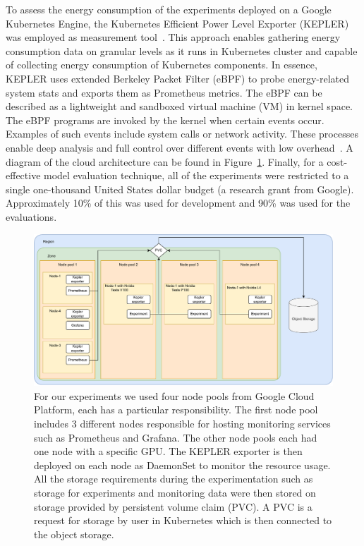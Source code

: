 \documentclass[conference]{IEEEtran}
\begin{document}
{To assess the energy consumption of the experiments deployed on a Google Kubernetes Engine, the Kubernetes Efficient Power Level Exporter (KEPLER) was employed as measurement tool~\cite{amaral2023kepler}. This approach enables gathering energy consumption data on granular levels as it runs in Kubernetes cluster and capable of collecting energy consumption of Kubernetes components. In essence, KEPLER uses extended Berkeley Packet Filter (eBPF) to probe energy-related system stats and exports them as Prometheus metrics. The eBPF can be described as a lightweight and sandboxed virtual machine (VM) in kernel space. The eBPF programs are invoked by the kernel when certain events occur. Examples of such events include system calls or network activity. These processes enable deep analysis and full control over different events with low overhead~\cite{sedghpour@ebpf}. A diagram of the cloud architecture can be found in Figure~\ref{fig:architecture}. Finally, for a cost-effective model evaluation technique, all of the experiments were restricted to a single one-thousand United States dollar budget (a research grant from Google). Approximately 10\% of this was used for development and 90\% was used for the evaluations.

\begin{figure}
    \centering
    \includegraphics[width=.8\textwidth]{plots/architecture.pdf}
    \caption{For our experiments we used four node pools from Google Cloud Platform, each has a particular responsibility. The first node pool includes 3 different nodes responsible for hosting monitoring services such as Prometheus and Grafana.  The other node pools each had one node with a specific GPU.  The KEPLER exporter is then deployed on each node as DaemonSet to monitor the resource usage.  All the storage requirements during the experimentation such as storage for experiments and monitoring data were then stored on storage provided by persistent volume claim (PVC). A PVC is a request for storage by user in Kubernetes which is then connected to the object storage.}
    \label{fig:architecture}
\end{figure}


}
\end{document}
